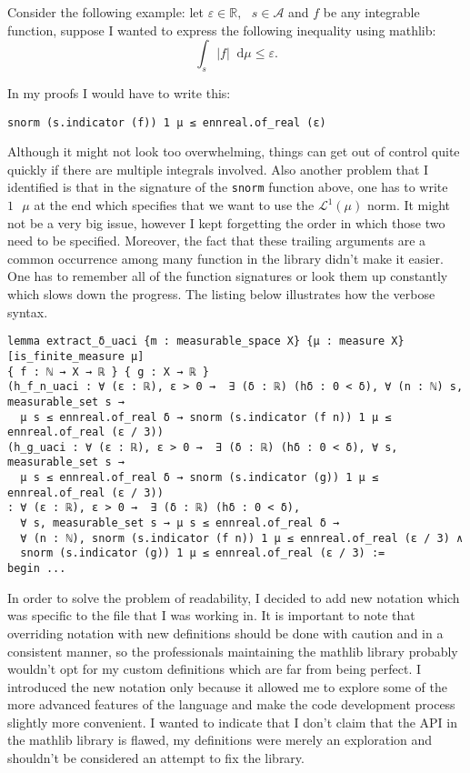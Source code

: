 \documentclass[11pt]{article}
\newenvironment{code}{\captionsetup{type=listing}}{}
\newcommand\R{\mathbb{R}}
\newcommand\Lmu{\mathcal{L}^1(\mu)}
\newcommand\A{\mathcal{A}}
\newcommand\sep{\text{ }}
\newcommand*\diff{\mathop{}\!\mathrm{d}}
\begin{document}
Consider the following example: let $\varepsilon \in \R, \sep s \in \A$ and $f$ be
any integrable function, suppose I wanted to express the following inequality
using mathlib:
\[
\int_s |f|\diff\mu \le \varepsilon
.\]

In my proofs I would have to write this:
\begin{code}
\begin{verbatim}
snorm (s.indicator (f)) 1 μ ≤ ennreal.of_real (ε)
\end{verbatim}
\end{code}

Although it might not look too overwhelming, things can get out of control quite
quickly if there are multiple integrals involved. Also another problem that I
identified is that in the signature of the \texttt{snorm} function above, one
has to write $1 \sep \mu $ at the end which specifies that we want to use the
$\Lmu $ norm. It might not be a very big issue, however I kept forgetting
the order in which those two need to be specified. Moreover, the fact that these
trailing arguments are a common occurrence among many function in the library didn't
make it easier. One has to remember all of the function signatures or look them up constantly which slows down the
progress. The listing below illustrates how the verbose syntax.
\begin{code}
\begin{verbatim}
lemma extract_δ_uaci {m : measurable_space X} {μ : measure X} [is_finite_measure μ]
{ f : ℕ → X → ℝ } { g : X → ℝ }
(h_f_n_uaci : ∀ (ε : ℝ), ε > 0 →  ∃ (δ : ℝ) (hδ : 0 < δ), ∀ (n : ℕ) s, measurable_set s →
  μ s ≤ ennreal.of_real δ → snorm (s.indicator (f n)) 1 μ ≤ ennreal.of_real (ε / 3))
(h_g_uaci : ∀ (ε : ℝ), ε > 0 →  ∃ (δ : ℝ) (hδ : 0 < δ), ∀ s, measurable_set s →
  μ s ≤ ennreal.of_real δ → snorm (s.indicator (g)) 1 μ ≤ ennreal.of_real (ε / 3))
: ∀ (ε : ℝ), ε > 0 →  ∃ (δ : ℝ) (hδ : 0 < δ),
  ∀ s, measurable_set s → μ s ≤ ennreal.of_real δ →
  ∀ (n : ℕ), snorm (s.indicator (f n)) 1 μ ≤ ennreal.of_real (ε / 3) ∧
  snorm (s.indicator (g)) 1 μ ≤ ennreal.of_real (ε / 3) :=
begin ...
\end{verbatim}
\end{code}

In order to solve the problem of readability, I decided to add new notation which
was specific to the file that I was working in. It is important to note that
overriding notation with new definitions should be done with caution and in a
consistent manner, so the professionals maintaining the mathlib library probably
wouldn't opt for my custom definitions which are far from being perfect. I introduced
the new notation only because it allowed me to explore some of the more advanced
features of the language and make the code development process slightly more
convenient. I wanted to indicate that I don't claim that the API in the mathlib
library is flawed, my definitions were merely an exploration and shouldn't be
considered an attempt to fix the library.
\end{document}
